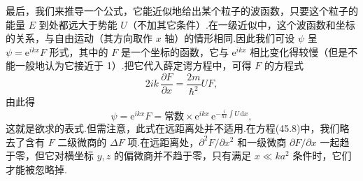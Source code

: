 最后，我们来推导一个公式，它能近似地给出某个粒子的波函数，只要这个粒子的能量 $E$ 到处都远大于势能 $U$（不加其它条件）.在一级近似中，这个波函数和坐标的关系，与自由运动（其方向取作 $x$ 轴）的情形相同.因此我们可设 $\psi$ 呈 $\psi=\mathrm{e}^{ikx}F$ 形式，其中的 $F$ 是一个坐标的函数，它与 $\mathrm{e}^{ikx}$ 相比变化得较慢（但是不能一般地认为它接近于 1）.把它代入薛定谔方程中，可得 $F$ 的方程式
\begin{equation}
  2ik\,\frac{\partial F}{\partial x}=\frac{2m}{\hbar^2}UF,
\end{equation}
由此得
\begin{equation}
  \psi=\mathrm{e}^{ikx}F=\text{常数}\times\mathrm{e}^{ikx}\,
  \mathrm{e}^{-\frac{i}{\hbar v}\int U\,\mathrm{d}x},
\end{equation}
这就是欲求的表式.但需注意，此式在远距离处并不适用.在方程(45.8)中，我们略去了含有 $F$ 二级微商的 $\Delta F$ 项.在远距离处，$\partial^2F/\partial x^2$ 和一级微商 $\partial F/\partial x$ 一起趋于零，但它对横坐标 $y,z$ 的偏微商并不趋于零，只有满足 $x\ll ka^2$ 条件时，它们才能被忽略掉.

